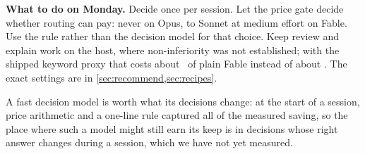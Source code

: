 \textbf{What to do on Monday.} Decide once per session. Let the price gate decide whether routing can pay: never on
Opus, to Sonnet at medium effort on Fable. Use the rule rather than the decision model for that choice. Keep review and
explain work on the host, where non-inferiority was not established; with the shipped keyword proxy that costs about
\KpProxyTwo\X\ of plain Fable instead of about \KpRstarTwo\X. The exact settings are in \cref{sec:recommend,sec:recipes}.

\begin{keyidea}[title={The one-sentence answer}]
A fast decision model is worth what its decisions change: at the start of a session, price arithmetic and a one-line
rule captured all of the measured saving, so the place where such a model might still earn its keep is in decisions
whose right answer changes during a session, which we have not yet measured.
\end{keyidea}
